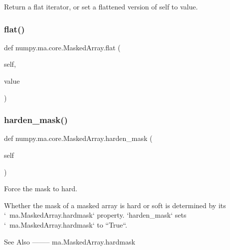\begin{DoxyVerb}Return a flat iterator, or set a flattened version of self to value. \end{DoxyVerb}
 \mbox{\label{classnumpy_1_1ma_1_1core_1_1MaskedArray_ac45f9a7b01f28159a21556ea985d2681}} 
\subsubsection{\texorpdfstring{flat()}{flat()}\hspace{0.1cm}{\footnotesize\ttfamily [2/2]}}
{\footnotesize\ttfamily def numpy.\+ma.\+core.\+Masked\+Array.\+flat (\begin{DoxyParamCaption}\item[{}]{self,  }\item[{}]{value }\end{DoxyParamCaption})}

\mbox{\label{classnumpy_1_1ma_1_1core_1_1MaskedArray_ab2fbfb0f77ec499b46842d4acbf3d01e}} 
\subsubsection{\texorpdfstring{harden\+\_\+mask()}{harden\_mask()}}
{\footnotesize\ttfamily def numpy.\+ma.\+core.\+Masked\+Array.\+harden\+\_\+mask (\begin{DoxyParamCaption}\item[{}]{self }\end{DoxyParamCaption})}

\begin{DoxyVerb}Force the mask to hard.

Whether the mask of a masked array is hard or soft is determined by
its `~ma.MaskedArray.hardmask` property. `harden_mask` sets
`~ma.MaskedArray.hardmask` to ``True``.

See Also
--------
ma.MaskedArray.hardmask\end{DoxyVerb}
 \mbox{\label{classnumpy_1_1ma_1_1core_1_1MaskedArray_a673554fc5a945048b3caa282d191072e}} 
